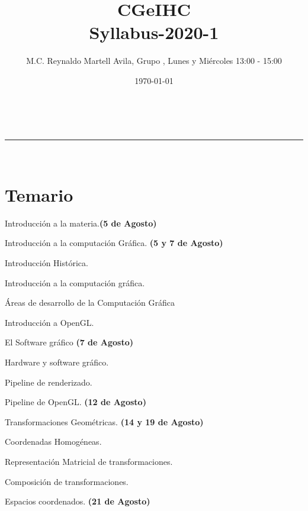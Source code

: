 \documentclass[a4paper,11pt]{article}
\makeatletter
\newcommand{\linia}{\rule{\linewidth}{0.5pt}}
\theoremstyle{mytheor}
\renewcommand{\maketitle}{
\begin{center}
\vspace{2ex}
{\huge \textsc{\@title}}
\vspace{1ex}
\\
\linia\\
\@author \hfill \@date
\vspace{4ex}
\end{center}
}
\makeatother
\begin{document}
\title{CGeIHC \\ Syllabus-2020-1}

\author{M.C. Reynaldo Martell Avila, Grupo  , Lunes y Miércoles 13:00 - 15:00}

\date{\today}

\maketitle

\section*{Temario}

Introducción a la materia.\textbf{(5 de Agosto)}
\begin{legal}
	\item Introducción a la computación Gráfica. \textbf{(5 y 7 de Agosto)}
	\begin{legal}
		\item Introducción Histórica.
		\begin{legal}
			\item Introducción a la computación gráfica.
			\item Áreas de desarrollo de la Computación Gráfica
			\item Introducción a OpenGL.
		\end{legal}
		\item El Software gráfico \textbf{(7 de Agosto)}
		\begin{legal}
			\item Hardware y software gráfico.
		\end{legal}
	\end{legal}
	\item Pipeline de renderizado. 
	\begin{legal}
		\item Pipeline de OpenGL. \textbf{(12 de Agosto)}
		\item Transformaciones Geométricas.  \textbf{(14 y 19 de Agosto)}
		\begin{legal}
			\item Coordenadas Homogéneas.
			\item Representación Matricial de transformaciones.
			\item Composición de transformaciones.
		\end{legal}
		\item Espacios coordenados. \textbf{(21 de Agosto)}

\end{legal}
\end{legal}
\end{document}

